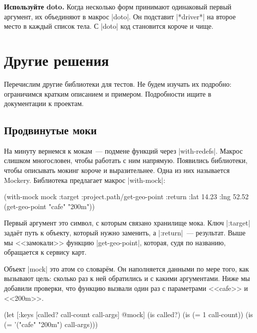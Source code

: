 
\textbf{Используйте doto.} Когда несколько форм принимают одинаковый первый
аргумент, их объединяют в макрос \spverb|doto|. Он подставит \spverb|*driver*|
на второе место в каждый список тела. С \spverb|doto| код становится короче и
чище.

\section{Другие решения}

Перечислим другие библиотеки для тестов. Не будем изучать их подробно:
ограничимся кратким описанием и примером. Подробности ищите в документации к
проектам.

\subsection{Продвинутые моки}


На минуту вернемся к мокам~--- подмене функций через
\spverb|with-redefs|. Макрос слишком многословен, чтобы работать с ним
напрямую. Появились библиотеки, чтобы описывать мокинг короче и
выразительнее. Одна из них называется Mockery.
Библиотека предлагает макрос \spverb|with-mock|:

\begin{english}
  \begin{clojure}
(with-mock mock
  {:target :project.path/get-geo-point
   :return {:lat 14.23 :lng 52.52}}
  (get-geo-point "cafe" "200m"))
  \end{clojure}
\end{english}

Первый аргумент это символ, с которым связано хранилище мока. Ключ \spverb|:target|
зада\"{е}т путь к объекту, который нужно заменить, а \spverb|:return|~---
результат. Выше мы <<замокали>> функцию \spverb|get-geo-point|, которая, судя по
названию, обращается к сервису карт.

Объект \spverb|mock| это атом со словар\"{е}м. Он наполняется данными по мере
того, как вызывают цель: сколько раз к ней обратились и с какими
аргументами. Ниже мы добавили проверки, что функцию вызвали один раз с
параметрами <<cafe>> и <<200m>>.

\begin{english}
  \begin{clojure}
(let [{:keys [called? call-count call-args]} @mock]
  (is called?)
  (is (= 1 call-count))
  (is (= '("cafe" "200m") call-args)))
  \end{clojure}
\end{english}

